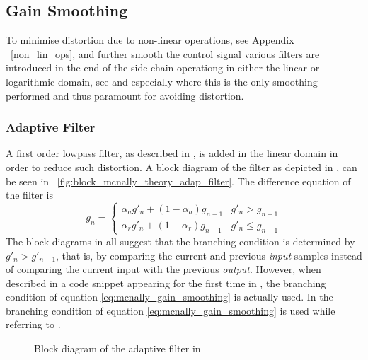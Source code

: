 \documentclass[../main2.tex]{subfiles}
\providecommand{\rootdir}{..}
\begin{document}
\subsection{Gain Smoothing}
To minimise distortion due to non-linear operations, see Appendix ~\ref{non_lin_ops}, and further smooth the control signal various filters are introduced in the end of the side-chain operationg in either the linear or logarithmic domain, see \cite{mcnally1984dynamic}\cite{frindle1996implementation} and especially \cite{reiss2012tutorial} where this is the only smoothing performed and thus paramount for avoiding distortion.
\subsubsection{Adaptive Filter} \label{adaptive_filter}
A first order lowpass filter, as described in \cite{mcnally1984}, is added in the linear domain in order to reduce such distortion. A block diagram of the filter as depicted in \cite{mcnally1984}, can be seen in ~\ref{fig:block_mcnally_theory_adap_filter}. The difference equation of the filter is
\begin{equation}
g_n = \begin{cases}
    \alpha_{a} g'_n + (1-\alpha_{a}) g_{n-1} 	& g'_n > g_{n-1} \\
    \alpha_{r} g'_n + (1-\alpha_{r}) g_{n-1} 	& g'_n \leq g_{n-1}
\end{cases}
\label{eq:mcnally_gain_smoothing}
\end{equation}
The block diagrams in \cite{mcnally1984dynamic}\cite{dafx02}\cite{dagx11}\cite{zolzer1997digital}\cite{zolzer2008digital} all suggest that the branching condition is determined by $g'_n > g'_{n-1}$, that is, by comparing the current and previous \emph{input} samples instead of comparing the current input with the previous \emph{output}. However, when described in a code snippet appearing for the first time in \cite{dafx11}, the branching condition of equation \eqref{eq:mcnally_gain_smoothing} is actually used. In \cite{bitzer2006parameter} the branching condition of equation \eqref{eq:mcnally_gain_smoothing} is used while referring to \cite{mcnally1984dynamic}\cite{dafx02}.
\begin{figure}
\centerline{}
\caption{Block diagram of the adaptive filter in \cite{mcnally1984dynamic}}
\label{fig:block_mcnally_theory_rms}
\end{figure}
\end{document}
